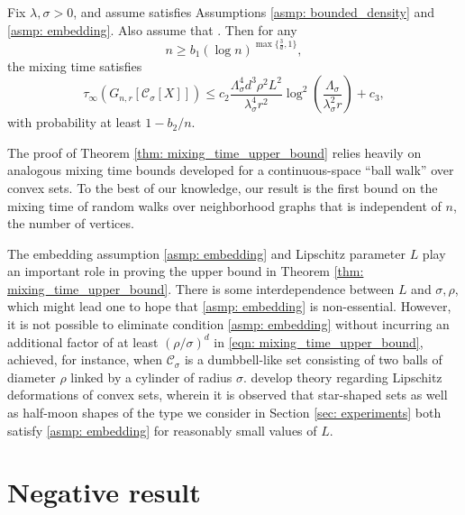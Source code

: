 \documentclass[11pt,twoside]{article}
\newcommand{\1}{\mathbbm{1}}
\newcommand{\Xbf}{X}
\newcommand{\Cbb}{\mathbb{C}}
\newcommand{\Cset}{\mathcal{C}}
\newcommand{\Csig}{\Cset_{\sigma}}
\begin{document}
\begin{theorem}
  \label{thm: mixing_time_upper_bound}
  Fix $\lambda, \sigma > 0$, and assume \smash{$\Cset \in \Cbb_f(\lambda)$} 
  satisfies Assumptions \ref{asmp: bounded_density} and \ref{asmp: embedding}.
  Also assume that . Then for any
  $$
  n \geq b_1 (\log n)^{\max\{\frac{3}{d},1\}},
  $$
  the mixing time satisfies
  \begin{equation} 
    \label{eqn: mixing_time_upper_bound}
    \tau_{\infty}(G_{n,r}[\Csig[\Xbf]]) \leq c_2 \frac{\Lambda_{\sigma}^4 d^3 
      \rho^2 L^2}{\lambda_{\sigma}^4 r^2} \log^2\left(\frac{
        \Lambda_{\sigma}}{\lambda_{\sigma}^2 r}\right) + c_3, 
  \end{equation}
  with probability at least $1 - b_2/n$.
\end{theorem}
The proof of Theorem \ref{thm: mixing_time_upper_bound} relies heavily on
analogous mixing time bounds developed for a continuous-space ``ball walk'' over
convex sets. To the best of our knowledge, our result is the first bound on the
mixing time of random walks over neighborhood graphs that is independent of $n$,
the number of vertices.    

\begin{remark}
  The embedding assumption \ref{asmp: embedding} and Lipschitz parameter $L$
  play an important role in proving the upper bound in Theorem \ref{thm:
    mixing_time_upper_bound}. There is some interdependence between $L$ and
  $\sigma,\rho$, which might lead one to hope that \ref{asmp: embedding} is
  non-essential. However, it is not possible to eliminate condition \ref{asmp:
    embedding} without incurring an additional factor of at least
  $(\rho/\sigma)^d$ in \eqref{eqn: mixing_time_upper_bound}, achieved, for
  instance, when $\Csig$ is a dumbbell-like set consisting of two balls of
  diameter $\rho$ linked by a cylinder of radius
  $\sigma$. \citet{abbasi-yadkori2016, abbasi-yadkori2016a}  
  develop theory regarding Lipschitz deformations of convex sets, wherein it
  is observed that star-shaped sets as well as half-moon shapes of the type we
  consider in Section \ref{sec: experiments} both satisfy \ref{asmp: embedding}
  for reasonably small values of $L$. 
\end{remark}

\section{Negative result}
\label{sec:lower_bound}
\end{document}

